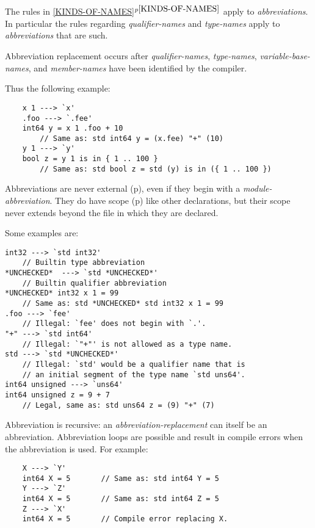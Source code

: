 \documentclass[12pt]{article}
\newcommand{\itemref}[1]{\ref{#1}$^{p\pageref{#1}}$}
\newcommand{\pagref}[1]{p\pageref{#1}}
\newenvironment{indpar}[1][0.3in]%
	{\begin{list}{}%
		     {\setlength{\itemsep}{0in}%
		      \setlength{\topsep}{0in}%
		      \setlength{\parsep}{1ex}%
		      \setlength{\labelwidth}{#1}%
		      \setlength{\leftmargin}{#1}%
		      \addtolength{\leftmargin}{\labelsep}}%
	 \item}%
	{\end{list}}
\begin{document}
The rules in \itemref{KINDS-OF-NAMES}
apply to {\em abbreviations}.  In particular the rules regarding
{\em qualifier-names} and {\em type-names} apply to {\em abbreviations}
that are such.

Abbreviation replacement occurs after
{\em qualifier-names},
{\em type-names}, {\em variable-base-names}, and
{\em member-names} have been identified by the compiler.

Thus the following example:
\begin{indpar}\begin{verbatim}
    x 1 ---> `x'
    .foo ---> `.fee'
    int64 y = x 1 .foo + 10
        // Same as: std int64 y = (x.fee) "+" (10)
    y 1 ---> `y'
    bool z = y 1 is in { 1 .. 100 }
        // Same as: std bool z = std (y) is in ({ 1 .. 100 })
\end{verbatim}\end{indpar}

Abbreviations are never external (\pagref{EXTERNAL}),%
\label{ABBREVIATIONS-ARE-NOT-EXTERNAL}
even if they begin with a {\em module-abbreviation}.
They do have scope (\pagref{SCOPE}) like other declarations, but their scope
never extends beyond the file in which they are declared.

Some examples are:
\begin{indpar}\begin{verbatim}
int32 ---> `std int32'
    // Builtin type abbreviation
*UNCHECKED*  ---> `std *UNCHECKED*'
    // Builtin qualifier abbreviation
*UNCHECKED* int32 x 1 = 99
    // Same as: std *UNCHECKED* std int32 x 1 = 99
.foo ---> `fee'
    // Illegal: `fee' does not begin with `.'.
"+" ---> `std int64'
    // Illegal: `"+"' is not allowed as a type name.
std ---> `std *UNCHECKED*'
    // Illegal: `std' would be a qualifier name that is
    // an initial segment of the type name `std uns64'.
int64 unsigned ---> `uns64'
int64 unsigned z = 9 + 7
    // Legal, same as: std uns64 z = (9) "+" (7)
\end{verbatim}\end{indpar}

Abbreviation is recursive: an {\em abbreviation-replacement} can
itself be an abbreviation.
Abbreviation loops are possible and result in compile errors when
the abbreviation is used.
For example:
\begin{indpar}\begin{verbatim}
    X ---> `Y'
    int64 X = 5       // Same as: std int64 Y = 5
    Y ---> `Z'
    int64 X = 5       // Same as: std int64 Z = 5
    Z ---> `X'
    int64 X = 5       // Compile error replacing X.
\end{verbatim}\end{indpar}
\end{document}
